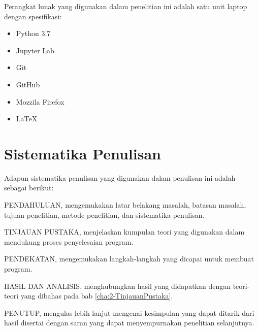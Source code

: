 Perangkat lunak yang digunakan dalam penelitian ini adalah satu unit laptop dengan spesifikasi:
\begin{itemize}
  \item Python 3.7
  \item Jupyter Lab
  \item Git
  \item GitHub
  \item Mozzila Firefox
  \item LaTeX
\end{itemize}

\section{Sistematika Penulisan}
\label{sec:1-SistematikaPenulisan}

Adapun sistematika penulisan yang digunakan dalam penulisan ini adalah sebagai berikut:

PENDAHULUAN, mengemukakan latar belakang masalah, batasan masalah, tujuan penelitian, metode
penelitian, dan sistematika penulisan.

TINJAUAN PUSTAKA, menjelaskan kumpulan teori yang digunakan dalam mendukung proses penyelesaian
program.

PENDEKATAN, mengemukakan langkah-langkah yang dicapai untuk membuat program.

HASIL DAN ANALISIS, menghubungkan hasil yang didapatkan dengan teori-teori yang dibahas pada bab
\ref{cha:2-TinjauanPustaka}.

PENUTUP, mengulas lebih lanjut mengenai kesimpulan yang dapat ditarik dari hasil disertai dengan
saran yang dapat menyempurnakan penelitian selanjutnya.